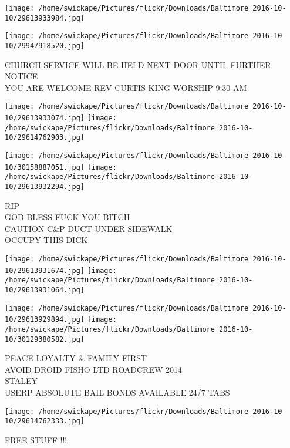 \documentclass[10pt,letterpaper]{article}
\begin{document}
\texttt{[image: /home/swickape/Pictures/flickr/Downloads/Baltimore 2016-10-10/29613933984.jpg]}

\vspace{0.25in}
\texttt{[image: /home/swickape/Pictures/flickr/Downloads/Baltimore 2016-10-10/29947918520.jpg]}

CHURCH SERVICE WILL BE HELD NEXT DOOR UNTIL FURTHER NOTICE\\
YOU ARE WELCOME REV CURTIS KING WORSHIP 9:30 AM\\
\pagebreak

\texttt{[image: /home/swickape/Pictures/flickr/Downloads/Baltimore 2016-10-10/29613933074.jpg]}
\texttt{[image: /home/swickape/Pictures/flickr/Downloads/Baltimore 2016-10-10/29614762903.jpg]}

\texttt{[image: /home/swickape/Pictures/flickr/Downloads/Baltimore 2016-10-10/30158887051.jpg]}
\texttt{[image: /home/swickape/Pictures/flickr/Downloads/Baltimore 2016-10-10/29613932294.jpg]}

RIP\\
GOD BLESS FUCK YOU BITCH\\
CAUTION C\&P DUCT UNDER SIDEWALK\\
OCCUPY THIS DICK\\
\pagebreak

\texttt{[image: /home/swickape/Pictures/flickr/Downloads/Baltimore 2016-10-10/29613931674.jpg]}
\texttt{[image: /home/swickape/Pictures/flickr/Downloads/Baltimore 2016-10-10/29613931064.jpg]}

\texttt{[image: /home/swickape/Pictures/flickr/Downloads/Baltimore 2016-10-10/29613929894.jpg]}
\texttt{[image: /home/swickape/Pictures/flickr/Downloads/Baltimore 2016-10-10/30129380582.jpg]}

PEACE LOYALTY \& FAMILY FIRST\\
AVOID DROID FISHO LTD ROADCREW 2014\\
STALEY\\
USERP ABSOLUTE BAIL BONDS AVAILABLE 24/7 TABS\\
\pagebreak

\texttt{[image: /home/swickape/Pictures/flickr/Downloads/Baltimore 2016-10-10/29614762333.jpg]}

FREE STUFF !!!\\
\pagebreak
\end{document}
